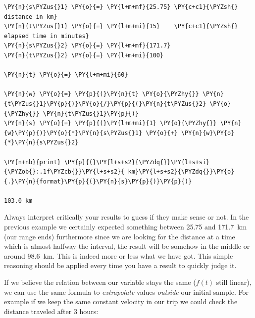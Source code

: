 \begin{tcolorbox}[breakable, size=fbox, boxrule=1pt, pad at break*=1mm,colback=cellbackground, colframe=cellborder]
\begin{Verbatim}[commandchars=\\\{\}]
\PY{n}{s\PYZus{}1} \PY{o}{=} \PY{l+m+mf}{25.75} \PY{c+c1}{\PYZsh{} distance in km}
\PY{n}{t\PYZus{}1} \PY{o}{=} \PY{l+m+mi}{15}    \PY{c+c1}{\PYZsh{} elapsed time in minutes}
\PY{n}{s\PYZus{}2} \PY{o}{=} \PY{l+m+mf}{171.7}
\PY{n}{t\PYZus{}2} \PY{o}{=} \PY{l+m+mi}{100}

\PY{n}{t} \PY{o}{=} \PY{l+m+mi}{60}

\PY{n}{w} \PY{o}{=} \PY{p}{(}\PY{n}{t} \PY{o}{\PYZhy{}} \PY{n}{t\PYZus{}1}\PY{p}{)}\PY{o}{/}\PY{p}{(}\PY{n}{t\PYZus{}2} \PY{o}{\PYZhy{}} \PY{n}{t\PYZus{}1}\PY{p}{)}
\PY{n}{s} \PY{o}{=} \PY{p}{(}\PY{l+m+mi}{1} \PY{o}{\PYZhy{}} \PY{n}{w}\PY{p}{)}\PY{o}{*}\PY{n}{s\PYZus{}1} \PY{o}{+} \PY{n}{w}\PY{o}{*}\PY{n}{s\PYZus{}2}

\PY{n+nb}{print} \PY{p}{(}\PY{l+s+s2}{\PYZdq{}}\PY{l+s+si}{\PYZob{}:.1f\PYZcb{}}\PY{l+s+s2}{ km}\PY{l+s+s2}{\PYZdq{}}\PY{o}{.}\PY{n}{format}\PY{p}{(}\PY{n}{s}\PY{p}{)}\PY{p}{)}

103.0 km
\end{Verbatim}
\end{tcolorbox}

Always interpret critically your results to guess if they make sense or not. In the previous example we certainly expected something between 25.75 and 171.7~km (our range ends) furthermore since we are looking for the distance at a time which is almost halfway the interval, the result will be somehow in the middle or around 98.6~km. This is indeed more or less what we have got.
This simple reasoning should be applied every time you have a result to quickly judge it.

If we believe the relation between our variable stays the same ($f(t)$ still linear), we can use the same formula to \emph{extrapolate} values \emph{outside} our initial sample. For example if we keep the same constant velocity in our trip we could check the distance traveled after 3 hours:

